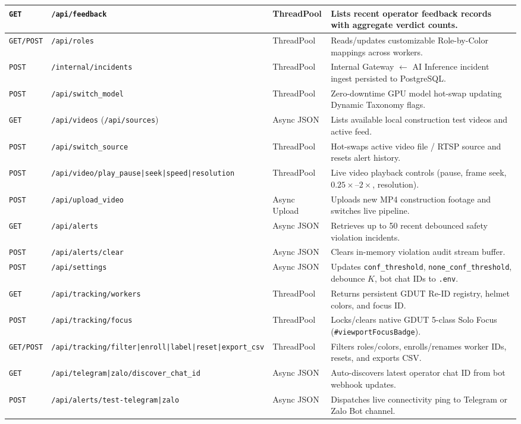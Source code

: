 \begin{longtable}{|>{\centering\arraybackslash}p{1.4cm}|>{\raggedright\arraybackslash}p{4.8cm}|>{\raggedright\arraybackslash}p{1.7cm}|>{\raggedright\arraybackslash}p{5.8cm}|}
\texttt{GET}  & \texttt{/api/feedback} & ThreadPool & Lists recent operator feedback records with aggregate verdict counts. \\ \hline
\texttt{GET/POST} & \texttt{/api/roles} & ThreadPool & Reads/updates customizable Role-by-Color mappings across workers. \\ \hline
\texttt{POST} & \nolinkurl{/internal/incidents} & ThreadPool & Internal Gateway $\leftarrow$ AI Inference incident ingest persisted to PostgreSQL. \\ \hline
\texttt{POST} & \nolinkurl{/api/switch_model} & ThreadPool & Zero-downtime GPU model hot-swap updating Dynamic Taxonomy flags. \\ \hline
\texttt{GET}  & \texttt{/api/videos} (\texttt{/api/sources}) & Async JSON & Lists available local construction test videos and active feed. \\ \hline
\texttt{POST} & \nolinkurl{/api/switch_source} & ThreadPool & Hot-swaps active video file / RTSP source and resets alert history. \\ \hline
\texttt{POST} & \nolinkurl{/api/video/play_pause|seek|speed|resolution} & ThreadPool & Live video playback controls (pause, frame seek, $0.25\times$--$2\times$, resolution). \\ \hline
\texttt{POST} & \nolinkurl{/api/upload_video} & Async Upload & Uploads new MP4 construction footage and switches live pipeline. \\ \hline
\texttt{GET}  & \texttt{/api/alerts} & Async JSON & Retrieves up to 50 recent debounced safety violation incidents. \\ \hline
\texttt{POST} & \nolinkurl{/api/alerts/clear} & Async JSON & Clears in-memory violation audit stream buffer. \\ \hline
\texttt{POST} & \texttt{/api/settings} & Async JSON & Updates \texttt{conf\_threshold}, \nolinkurl{none_conf_threshold}, debounce $K$, bot chat IDs to \texttt{.env}. \\ \hline
\texttt{GET}  & \nolinkurl{/api/tracking/workers} & ThreadPool & Returns persistent GDUT Re-ID registry, helmet colors, and focus ID. \\ \hline
\texttt{POST} & \nolinkurl{/api/tracking/focus} & ThreadPool & Locks/clears native GDUT 5-class Solo Focus (\texttt{\#viewportFocusBadge}). \\ \hline
\texttt{GET/POST} & \nolinkurl{/api/tracking/filter|enroll|label|reset|export_csv} & ThreadPool & Filters roles/colors, enrolls/renames worker IDs, resets, and exports CSV. \\ \hline
\texttt{GET}  & \nolinkurl{/api/telegram|zalo/discover_chat_id} & Async JSON & Auto-discovers latest operator chat ID from bot webhook updates. \\ \hline
\texttt{POST} & \nolinkurl{/api/alerts/test-telegram|zalo} & Async JSON & Dispatches live connectivity ping to Telegram or Zalo Bot channel. \\ \hline
\end{longtable}

